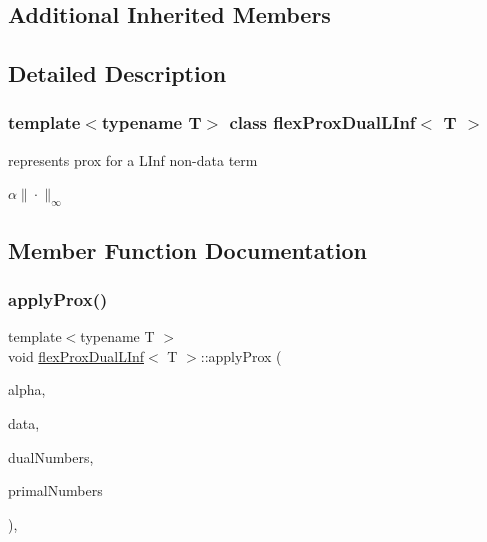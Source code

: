 \subsection*{Additional Inherited Members}


\subsection{Detailed Description}
\subsubsection*{template$<$typename T$>$\newline
class flex\+Prox\+Dual\+L\+Inf$<$ T $>$}

represents prox for a L\+Inf non-\/data term 

$ \alpha \|\cdot\|_{\infty} $ 

\subsection{Member Function Documentation}
\mbox{\label{classflex_prox_dual_l_inf_a90e3ad5244d8bf6cef50541593fb9da0}} 
\subsubsection{\texorpdfstring{apply\+Prox()}{applyProx()}\hspace{0.1cm}{\footnotesize\ttfamily [1/2]}}
{\footnotesize\ttfamily template$<$typename T $>$ \\
void \hyperlink{classflex_prox_dual_l_inf}{flex\+Prox\+Dual\+L\+Inf}$<$ T $>$\+::apply\+Prox (\begin{DoxyParamCaption}\item[{T}]{alpha,  }\item[{\hyperlink{classflex_box_data}{flex\+Box\+Data}$<$ T $>$ $\ast$}]{data,  }\item[{const std\+::vector$<$ int $>$ \&}]{dual\+Numbers,  }\item[{const std\+::vector$<$ int $>$ \&}]{primal\+Numbers }\end{DoxyParamCaption})\hspace{0.3cm}{\ttfamily [inline]}, {\ttfamily [virtual]}}



